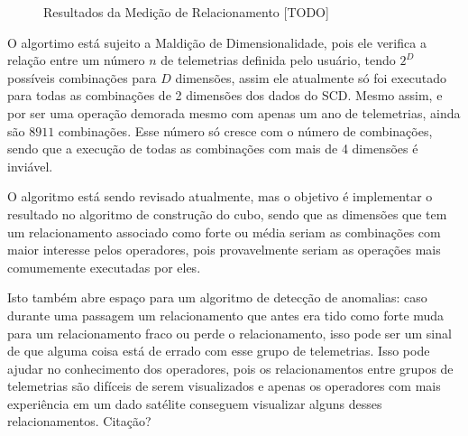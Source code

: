 \begin{figure}[ht]
	\caption{\color{red} Resultados da Medição de Relacionamento [TODO]}
	\vspace{6mm}
	\begin{center}
	\end{center}
	\vspace{4mm}
	\legenda{}
	\label{fig:similarityresults}
\end{figure}

O algortimo está sujeito a Maldição de Dimensionalidade, pois ele verifica a relação entre um número $n$ de telemetrias definida pelo usuário, tendo $2^D$ possíveis combinações para $D$ dimensões, assim ele atualmente só foi executado para todas as combinações de 2 dimensões dos dados do SCD.
Mesmo assim, e por ser uma operação demorada mesmo com apenas um ano de telemetrias, ainda são $8911$ combinações.
Esse número só cresce com o número de combinações, sendo que a execução de todas as combinações com mais de 4 dimensões é inviável.

O algoritmo está sendo revisado atualmente, mas o objetivo é implementar o resultado no algoritmo de construção do cubo, sendo que as dimensões que tem um relacionamento associado como forte ou média seriam as combinações com maior interesse pelos operadores, pois provavelmente seriam as operações mais comumemente executadas por eles.

Isto também abre espaço para um algoritmo de detecção de anomalias: caso durante uma passagem um relacionamento que antes era tido como forte muda para um relacionamento fraco ou perde o relacionamento, isso pode ser um sinal de que alguma coisa está de errado com esse grupo de telemetrias.
Isso pode ajudar no conhecimento dos operadores, pois os relacionamentos entre grupos de telemetrias são difíceis de serem visualizados e apenas os operadores com mais experiência em um dado satélite conseguem visualizar alguns desses relacionamentos.
{\color{red} Citação?}

